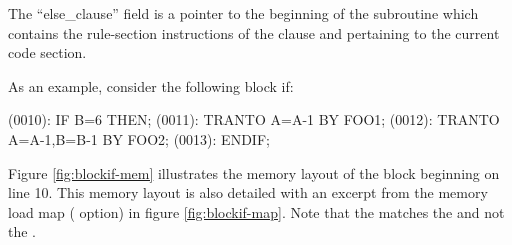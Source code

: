The ``else\_clause'' field is a pointer to the beginning of the subroutine
which contains the rule-section instructions of the  clause
and pertaining to the current code section.

As an example, consider the following block if:
\begin{logfileexample}
(0010):    IF B=6 THEN;
(0011):       TRANTO A=A-1 BY FOO1;
(0012):       TRANTO A=A-1,B=B-1 BY FOO2;
(0013):    ENDIF;
\end{logfileexample}

Figure \ref{fig:blockif-mem} illustrates the memory layout of the block 
beginning on line 10.   This memory layout is also detailed with an excerpt
from the memory load
map ( option) in figure \ref{fig:blockif-map}.
Note that the  matches the  and
not the .
\startfig
